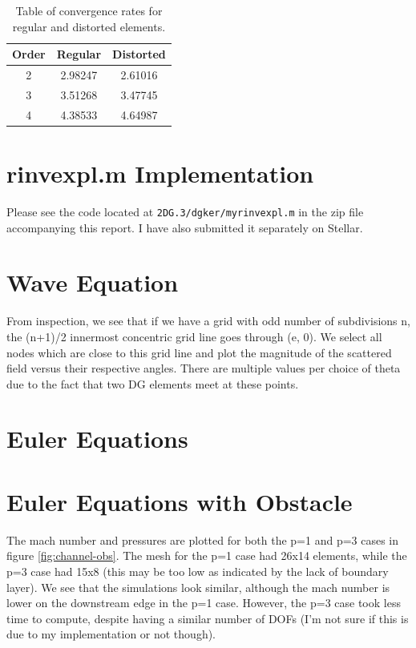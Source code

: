 \documentclass{article}
\begin{document}
\begin{table}[!ht]
\centering
\caption{Table of convergence rates for regular and distorted elements.}
\label{tbl:cc}
\begin{tabular}{c c c}
Order & Regular & Distorted \\
\midrule
2 & 2.98247 & 2.61016\\
3 & 3.51268 & 3.47745 \\
4 & 4.38533 & 4.64987 \\
\end{tabular}
\end{table}

\section{rinvexpl.m Implementation}
Please see the code located at \texttt{2DG.3/dgker/myrinvexpl.m} in the zip file accompanying this report.
I have also submitted it separately on Stellar.

\section{Wave Equation}
From inspection, we see that if we have a grid with odd number of subdivisions n, the (n+1)/2 innermost concentric grid line goes through (e, 0).
We select all nodes which are close to this grid line and plot the magnitude of the scattered field versus their respective angles.
There are multiple values per choice of theta due to the fact that two DG elements meet at these points.

\section{Euler Equations}

\section{Euler Equations with Obstacle}
The mach number and pressures are plotted for both the p=1 and p=3 cases in figure \ref{fig:channel-obs}.
The mesh for the p=1 case had 26x14 elements, while the p=3 case had 15x8 (this may be too low as indicated by the lack of boundary layer).
We see that the simulations look similar, although the mach number is lower on the downstream edge in the p=1 case.
However, the p=3 case took less time to compute, despite having a similar number of DOFs (I'm not sure if this is due to my implementation or not though).
\end{document}
